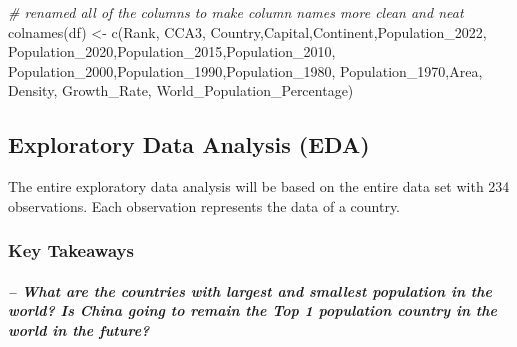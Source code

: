 \documentclass[
]{article}
\newenvironment{Shaded}{\begin{snugshade}}{\end{snugshade}}
\newcommand{\CommentTok}[1]{\textcolor[rgb]{0.56,0.35,0.01}{\textit{#1}}}
\newcommand{\FunctionTok}[1]{\textcolor[rgb]{0.00,0.00,0.00}{#1}}
\newcommand{\NormalTok}[1]{#1}
\newcommand{\OtherTok}[1]{\textcolor[rgb]{0.56,0.35,0.01}{#1}}
\newcommand{\StringTok}[1]{\textcolor[rgb]{0.31,0.60,0.02}{#1}}
\begin{document}
\begin{Shaded}
\begin{Highlighting}[]
\CommentTok{\# renamed all of the columns to make column names more clean and neat}
\FunctionTok{colnames}\NormalTok{(df) }\OtherTok{\textless{}{-}} \FunctionTok{c}\NormalTok{(}\StringTok{\textquotesingle{}Rank\textquotesingle{}}\NormalTok{, }\StringTok{\textquotesingle{}CCA3\textquotesingle{}}\NormalTok{, }\StringTok{\textquotesingle{}Country\textquotesingle{}}\NormalTok{,}\StringTok{\textquotesingle{}Capital\textquotesingle{}}\NormalTok{,}\StringTok{\textquotesingle{}Continent\textquotesingle{}}\NormalTok{,}\StringTok{\textquotesingle{}Population\_2022\textquotesingle{}}\NormalTok{,}
                  \StringTok{\textquotesingle{}Population\_2020\textquotesingle{}}\NormalTok{,}\StringTok{\textquotesingle{}Population\_2015\textquotesingle{}}\NormalTok{,}\StringTok{\textquotesingle{}Population\_2010\textquotesingle{}}\NormalTok{,}
                  \StringTok{\textquotesingle{}Population\_2000\textquotesingle{}}\NormalTok{,}\StringTok{\textquotesingle{}Population\_1990\textquotesingle{}}\NormalTok{,}\StringTok{\textquotesingle{}Population\_1980\textquotesingle{}}\NormalTok{,}
                  \StringTok{\textquotesingle{}Population\_1970\textquotesingle{}}\NormalTok{,}\StringTok{\textquotesingle{}Area\textquotesingle{}}\NormalTok{, }\StringTok{\textquotesingle{}Density\textquotesingle{}}\NormalTok{, }\StringTok{\textquotesingle{}Growth\_Rate\textquotesingle{}}\NormalTok{,}
                  \StringTok{\textquotesingle{}World\_Population\_Percentage\textquotesingle{}}\NormalTok{)}
\end{Highlighting}
\end{Shaded}

\hypertarget{exploratory-data-analysis-eda}{%
\subsection{Exploratory Data Analysis
(EDA)}\label{exploratory-data-analysis-eda}}

The entire exploratory data analysis will be based on the entire data
set with 234 observations. Each observation represents the data of a
country.

\hypertarget{key-takeaways}{%
\subsubsection{Key Takeaways}\label{key-takeaways}}

\hypertarget{what-are-the-countries-with-largest-and-smallest-population-in-the-world-is-china-going-to-remain-the-top-1-population-country-in-the-world-in-the-future}{%
\subparagraph{-- What are the countries with largest and smallest
population in the world? Is China going to remain the Top 1 population
country in the world in the
future?}\label{what-are-the-countries-with-largest-and-smallest-population-in-the-world-is-china-going-to-remain-the-top-1-population-country-in-the-world-in-the-future}}
\end{document}

